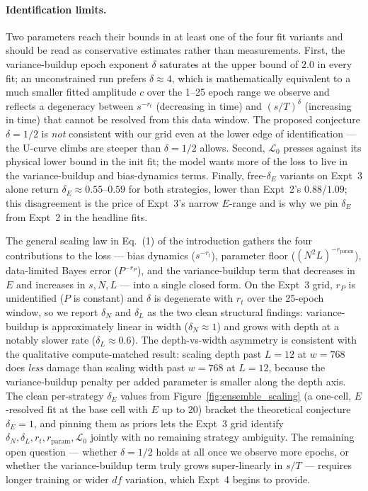 \paragraph{Identification limits.}
Two parameters reach their bounds in at least one of the four fit variants and should be read as conservative estimates rather than measurements.
First, the variance-buildup epoch exponent $\delta$ saturates at the upper bound of $2.0$ in every fit; an unconstrained run prefers $\delta \approx 4$, which is mathematically equivalent to a much smaller fitted amplitude $c$ over the 1--25 epoch range we observe and reflects a degeneracy between $s^{-r_t}$ (decreasing in time) and $(s/T)^\delta$ (increasing in time) that cannot be resolved from this data window.
The proposed conjecture $\delta = 1/2$ is \emph{not} consistent with our grid even at the lower edge of identification --- the U-curve climbs are steeper than $\delta = 1/2$ allows.
Second, $\mathcal{L}_0$ presses against its physical lower bound in the init fit; the model wants more of the loss to live in the variance-buildup and bias-dynamics terms.
Finally, free-$\delta_E$ variants on Expt~3 alone return $\delta_E \approx 0.55$--$0.59$ for both strategies, lower than Expt~2's $0.88$/$1.09$; this disagreement is the price of Expt~3's narrow $E$-range and is why we pin $\delta_E$ from Expt~2 in the headline fits.


The general scaling law in Eq.~(1) of the introduction gathers the four contributions to the loss --- bias dynamics ($s^{-r_t}$), parameter floor ($(N^2 L)^{-r_{\mathrm{param}}}$), data-limited Bayes error ($P^{-r_P}$), and the variance-buildup term that decreases in $E$ and increases in $s, N, L$ --- into a single closed form.
On the Expt~3 grid, $r_P$ is unidentified ($P$ is constant) and $\delta$ is degenerate with $r_t$ over the 25-epoch window, so we report $\delta_N$ and $\delta_L$ as the two clean structural findings: variance-buildup is approximately linear in width ($\delta_N \approx 1$) and grows with depth at a notably slower rate ($\delta_L \approx 0.6$).
The depth-vs-width asymmetry is consistent with the qualitative compute-matched result: scaling depth past $L = 12$ at $w = 768$ does \emph{less} damage than scaling width past $w = 768$ at $L = 12$, because the variance-buildup penalty per added parameter is smaller along the depth axis.
The clean per-strategy $\delta_E$ values from Figure~\ref{fig:ensemble_scaling} (a one-cell, $E$-resolved fit at the base cell with $E$ up to $20$) bracket the theoretical conjecture $\delta_E = 1$, and pinning them as priors lets the Expt~3 grid identify $\delta_N, \delta_L, r_t, r_{\mathrm{param}}, \mathcal{L}_0$ jointly with no remaining strategy ambiguity.
The remaining open question --- whether $\delta = 1/2$ holds at all once we observe more epochs, or whether the variance-buildup term truly grows super-linearly in $s/T$ --- requires longer training or wider $df$ variation, which Expt~4 begins to provide.
